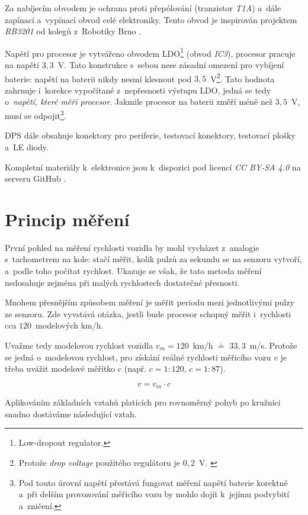 Za nabíjecím obvodem je ochrana proti přepólování (tranzistor \textit{T1A})
a~dále zapínací a~vypínací obvod celé elektroniky. Tento obvod je inspirován
projektem \textit{RB3201} \cite{rb3201} od kolegů z~Robotiky Brno
\cite{roboticsbrno}.

Napětí pro procesor je vytvářeno obvodem \gls{LDO}\footnote{Low-dropout
regulator.} (obvod \textit{IC3}), procesor pracuje na napětí $3,3$~V. Tato
konstrukce s~sebou nese zásadní omezení pro vybíjení baterie: napětí na baterii
nikdy nesmí klesnout pod $3,5$~V\footnote{Protože \textit{drop voltage}
použitého regulátoru je $0,2$~V. \cite{ldo:datasheet}}. Tato hodnota zahrnuje
i~korekce vypočítané z~nepřesnosti výstupu \gls{LDO}, jedná se tedy
o~\textit{napětí, které měří procesor}. Jakmile procesor na baterii změří méně
než $3,5$~V, musí se odpojit\footnote{Pod touto úrovní napětí přestává fungovat
měření napětí baterie korektně a~při delším provozování měřicího vozu by mohlo
dojít k~jejímu podvybití a~zničení.}.

DPS dále obsahuje konektory pro periferie, testovací konektory, testovací
plošky a~LE diody.

Kompletní materiály k~elektronice jsou k~dispozici pod licencí \textit{CC BY-SA
4.0} na serveru GitHub \cite{wsm-pcb}.

\section{Princip měření}
\label{sec:wsm-mer-princip}

První pohled na měření rychlosti vozidla by mohl vycházet z~analogie
s~tachometrem na kole: stačí měřit, kolik pulzů za sekundu se na senzoru vytvoří,
a~podle toho počítat rychlost. Ukazuje se však, že tato metoda měření nedosahuje
zejména při malých rychlostech dostatečné přesnosti.

Mnohem přesnějším způsobem měření je měřit periodu mezi jednotlivými pulzy ze
senzoru. Zde vyvstává otázka, jestli bude procesor schopný měřit i~rychlosti
cca $120$~modelových km/h.

Uvažme tedy modelovou rychlost vozidla $v_m = 120$~km/h $\doteq$ $33,3$~m/s.
Protože se jedná o~modelovou rychlost, pro získání reálné rychlosti měřicího
vozu $v$ je třeba uvážit modelové měřítko $c$ (např. $c = 1:120$, $c = 1:87$).

$$v = v_m \cdot c$$

Aplikováním základních vztahů platících pro rovnoměrný pohyb po kružnici snadno
dostáváme následující vztah.

